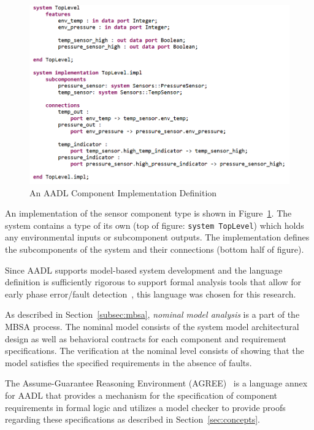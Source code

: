 \begin{figure}[h!]
	\begin{center}
	\includegraphics[width=1.0\textwidth]{images/aadlImplementation.png}
	\caption{An AADL Component Implementation Definition}
	\label{fig:aadlImplementation}
	\end{center}
\end{figure}

An implementation of the sensor component type is shown in Figure~\ref{fig:aadlImplementation}. The system contains a type of its own (top of figure: \texttt{system TopLevel}) which holds any environmental inputs or subcomponent outputs. The implementation defines the subcomponents of the system and their connections (bottom half of figure). 

Since AADL supports model-based system development and the language definition is sufficiently rigorous to support formal analysis tools that allow for early phase error/fault detection~\cite{FeilerModelBasedEngineering2012}, this language was chosen for this research. 

As described in Section~\ref{subsec:mbsa}, {\em nominal model analysis} is a part of the MBSA process. The nominal model consists of the system model architectural design as well as behavioral contracts for each component and requirement specifications. The verification at the nominal level consists of showing that the model satisfies the specified requirements in the absence of faults. 

The Assume-Guarantee Reasoning Environment (AGREE)~\cite{cofer2012compositional} is a language annex for AADL that provides a mechanism for the specification of component requirements in formal logic and utilizes a model checker to provide proofs regarding these specifications as described in Section~\ref{sec:concepts}. 

